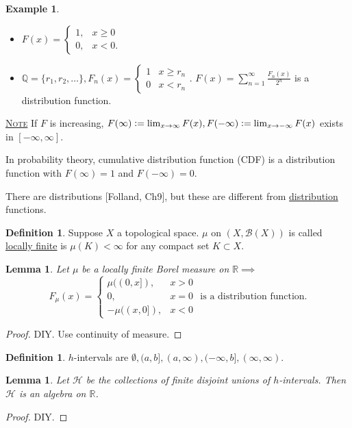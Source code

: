 \documentclass{report}
\newcommand{\R}{\mathbb{R}}
\newcommand{\Q}{\mathbb{Q}}
\newcommand{\defeq}{\vcentcolon=}
\newcommand{\fancyem}[1]{\underline{\textsc{#1}}}
\newtheorem{lemma}[theorem]{Lemma}
\theoremstyle{definition}
\newtheorem{definition}[theorem]{Definition}
\newtheorem{example}[theorem]{Example}
\theoremstyle{remark}
\newcommand{\fnl}{\parbox[t]{0\linewidth}{}}
\begin{document}
\begin{example}\fnl
\begin{itemize}
\item
$F(x) = \begin{cases}
1, & x \geq 0 \\
0, & x < 0.
\end{cases}$
\item
$\Q = \{r_1, r_2, \ldots\}, F_n(x) = \begin{cases}
1 & x \geq r_n \\
0 & x < r_n
\end{cases}$. $\displaystyle F(x) = \sum_{n=1}^\infty \frac{F_n(x)}{2^n}$ is a distribution function.
\end{itemize}
\end{example}

\fancyem{Note} If $F$ is increasing, $F(\infty) \defeq \lim_{x \to \infty} F(x), F(-\infty) \defeq \lim_{x \to -\infty} F(x)$ exists in $[-\infty, \infty]$.

In probability theory, cumulative distribution function (CDF) is a distribution function with $F(\infty) = 1$ and $F(-\infty) = 0$.

There are distributions [Folland, Ch9], but these are different from \underline{distribution} functions.

\begin{definition}
Suppose $X$ a topological space. $\mu$ on $(X, \mathcal{B}(X))$ is called \underline{locally finite} is $\mu(K) < \infty$ for any compact set $K \subset X$.
\end{definition}

\begin{lemma}
Let $\mu$ be a locally finite Borel measure on $\R \implies$
\[
F_\mu(x) = \begin{cases}
\mu((0, x]), & x > 0 \\
0, & x = 0 \\
- \mu((x, 0]), & x < 0
\end{cases} \text{ is a distribution function.}
\]
\end{lemma}
\begin{proof}
DIY. Use continuity of measure.
\end{proof}

\begin{definition}
$h$-intervals are $\emptyset, (a, b], (a, \infty), (-\infty, b], (\infty, \infty)$.
\end{definition}

\begin{lemma}
Let $\mathcal{H}$ be the collections of finite disjoint unions of $h$-intervals. Then $\mathcal{H}$ is an algebra on $\R$.
\end{lemma}
\begin{proof}
DIY.
\end{proof}
\end{document}
